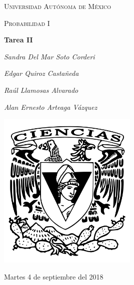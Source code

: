 \documentclass[12pt,a4paper]{report}
\begin{document}
\begin{titlepage}
	\centering
	{\scshape\LARGE Universidad Autónoma de México \par}
	\vspace{1cm}
	{\scshape\Large Probabilidad I\par}
	\vspace{1.5cm}
	{\huge\bfseries Tarea II\par}
	\vspace{.5cm}
	{\Large\itshape Sandra Del Mar Soto Corderi \par}
	\vspace{.5cm}
	{\Large\itshape Edgar Quiroz Castañeda \par}
    \vspace{.5cm}
	{\Large\itshape Raúl Llamosas Alvarado \par}
	 \vspace{.5cm}
	{\Large\itshape Alan Ernesto Arteaga Vázquez \par}
	\vfill
	 \includegraphics[width=0.5\textwidth]{escudo.png}
	\vfill

	{\large Martes 4 de septiembre del 2018 \par}
\end{titlepage}

\pagebreak
\setlength{\voffset}{-0.75in}
\setlength{\headsep}{5pt}
\end{document}
